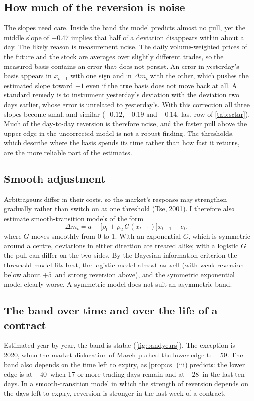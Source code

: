 \subsection{How much of the reversion is noise}
The slopes need care. Inside the band the model predicts almost no pull, yet the middle slope of $-0.47$ implies that
half of a deviation disappears within about a day. The likely reason is measurement noise. The daily volume-weighted
prices of the future and the stock are averages over slightly different trades, so the measured basis contains an error
that does not persist. An error in yesterday's basis appears in $x_{t-1}$ with one sign and in $\Delta m_t$ with the
other, which pushes the estimated slope toward $-1$ even if the true basis does not move back at all. A standard remedy
is to instrument yesterday's deviation with the deviation two days earlier, whose error is unrelated to yesterday's. With
this correction all three slopes become small and similar ($-0.12$, $-0.19$ and $-0.14$, last row of \cref{tab:setar}).
Much of the day-to-day reversion is therefore noise, and the faster pull above the upper edge in the uncorrected model is
not a robust finding. The thresholds, which describe where the basis spends its time rather than how fast it returns, are
the more reliable part of the estimates.

\subsection{Smooth adjustment}
Arbitrageurs differ in their costs, so the market's response may strengthen gradually rather than switch on at one
threshold (Tse, 2001). I therefore also estimate smooth-transition models of the form
\begin{equation}\label{eq:star}
\Delta m_t=a+\big[\rho_1+\rho_2\,G(x_{t-1})\big]x_{t-1}+e_t ,
\end{equation}
where $G$ moves smoothly from 0 to 1. With an exponential $G$, which is symmetric around a centre, deviations in either
direction are treated alike; with a logistic $G$ the pull can differ on the two sides. By the Bayesian information
criterion the threshold model fits best, the logistic model almost as well (with weak reversion below about $+5$\bp\
and strong reversion above), and the symmetric exponential model clearly worse. A symmetric model does not suit an
asymmetric band.

\subsection{The band over time and over the life of a contract}
Estimated year by year, the band is stable (\cref{fig:bandyears}). The exception is 2020, when the market dislocation
of March pushed the lower edge to $-59$\bp. The band also depends on the time left to expiry, as \cref{prop:cs} (iii)
predicts: the lower edge is at $-40$\bp\ when 17 or more trading days remain and at $-28$\bp\ in the last ten days. In a
smooth-transition model in which the strength of reversion depends on the days left to expiry, reversion is stronger in
the last week of a contract.

